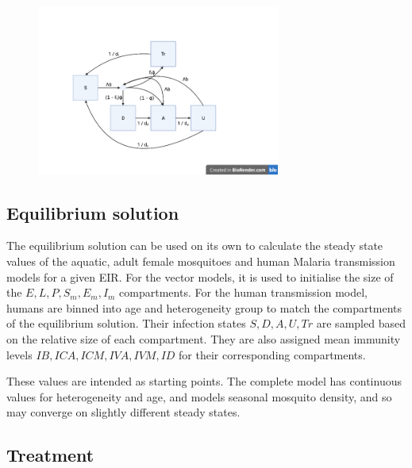 \documentclass{bmcart}
\begin{document}

\begin{figure}[h]
\includegraphics[width=8cm]{Human state transition.png}
\end{figure}

\subsection*{Equilibrium solution}

The equilibrium solution can be used on its own to calculate the steady state values of the aquatic, adult female mosquitoes and human Malaria transmission models for a given EIR. For the vector models, it is used to initialise the size of the $E,L,P,S_m,E_m,I_m$ compartments. For the human transmission model, humans are binned into age and heterogeneity group to match the compartments of the equilibrium solution. Their infection states $S,D,A,U,Tr$ are sampled based on the relative size of each compartment. They are also assigned mean immunity levels $IB,ICA,ICM,IVA,IVM,ID$ for their corresponding compartments.

These values are intended as starting points. The complete model has continuous values for heterogeneity and age, and models seasonal mosquito density, and so may converge on slightly different steady states.

\subsection*{Treatment}
\end{document}
